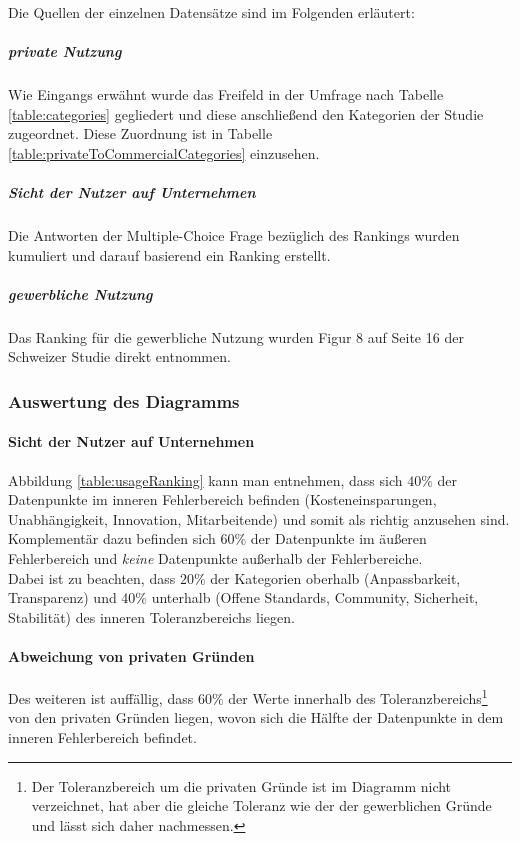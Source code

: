 \documentclass[a4paper]{article}
\begin{document}
                    Die Quellen der einzelnen Datensätze sind im Folgenden erläutert:
                    \subparagraph{private Nutzung} Wie Eingangs erwähnt wurde das Freifeld in der Umfrage nach Tabelle \ref{table:categories} gegliedert und diese anschließend den Kategorien der Studie zugeordnet. Diese Zuordnung ist in Tabelle \ref{table:privateToCommercialCategories} einzusehen.
                    
                    \subparagraph{Sicht der Nutzer auf Unternehmen} Die Antworten der Multiple-Choice Frage bezüglich des Rankings wurden kumuliert und darauf basierend ein Ranking erstellt.
                    
                    \subparagraph{gewerbliche Nutzung} Das Ranking für die gewerbliche Nutzung wurden Figur 8 auf Seite 16 der Schweizer Studie\cite{oss:studie} direkt entnommen.
            
            \subsubsection{Auswertung des Diagramms}
                \paragraph{Sicht der Nutzer auf Unternehmen}
                    Abbildung \ref{table:usageRanking} kann man entnehmen, dass sich $40\%$ der Datenpunkte im inneren Fehlerbereich befinden ({\scriptsize Kosteneinsparungen, Unabhängigkeit, Innovation, Mitarbeitende}) und somit als richtig anzusehen sind. Komplementär dazu befinden sich $60\%$ der Datenpunkte im äußeren Fehlerbereich und \emph{keine} Datenpunkte außerhalb der Fehlerbereiche.\\
                    Dabei ist zu beachten, dass $20\%$ der Kategorien oberhalb ({\scriptsize Anpassbarkeit, Transparenz}) und $40\%$ unterhalb ({\scriptsize Offene Standards, Community, Sicherheit, Stabilität}) des inneren Toleranzbereichs liegen.
                    
                \paragraph{Abweichung von privaten Gründen}
                    Des weiteren ist auffällig, dass $60\%$ der Werte innerhalb des Toleranzbereichs\footnote{Der Toleranzbereich um die privaten Gründe ist im Diagramm nicht verzeichnet, hat aber die gleiche Toleranz wie der der gewerblichen Gründe und lässt sich daher nachmessen.} von den privaten Gründen liegen, wovon sich die Hälfte der Datenpunkte in dem inneren Fehlerbereich befindet.
                               
\end{document}
